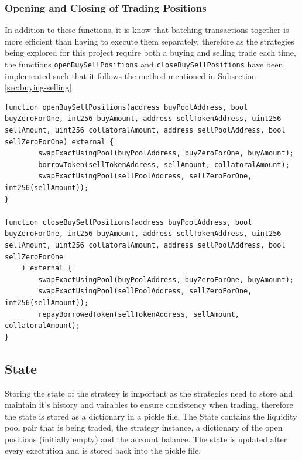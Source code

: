 \subsubsection{Opening and Closing of Trading Positions}
In addition to these functions, it is know that batching transactions together is more efficient than having to execute them separately, therefore as the strategies being explored for this project require both a buying and selling trade each time, the functions \texttt{openBuySellPositions} and \texttt{closeBuySellPositions} have been implemented such that it follows the method mentioned in Subsection \ref{sec:buying-selling}.

\begin{lstlisting}[language=Solidity]
function openBuySellPositions(address buyPoolAddress, bool buyZeroForOne, int256 buyAmount, address sellTokenAddress, uint256 sellAmount, uint256 collatoralAmount, address sellPoolAddress, bool sellZeroForOne) external {
        swapExactUsingPool(buyPoolAddress, buyZeroForOne, buyAmount);
        borrowToken(sellTokenAddress, sellAmount, collatoralAmount);
        swapExactUsingPool(sellPoolAddress, sellZeroForOne, int256(sellAmount));
}

function closeBuySellPositions(address buyPoolAddress, bool buyZeroForOne, int256 buyAmount, address sellTokenAddress, uint256 sellAmount, uint256 collatoralAmount, address sellPoolAddress, bool sellZeroForOne
    ) external {
        swapExactUsingPool(buyPoolAddress, buyZeroForOne, buyAmount);
        swapExactUsingPool(sellPoolAddress, sellZeroForOne, int256(sellAmount));
        repayBorrowedToken(sellTokenAddress, sellAmount, collatoralAmount);
}
\end{lstlisting}

\subsection{State}
Storing the state of the strategy is important as the strategies need to store and maintain it's history and vairables to ensure consistency when trading, therefore the state is stored as a dictionary in a pickle file. The State contains the liquidity pool pair that is being traded, the strategy instance, a dictionary of the open positions (initially empty) and the account balance. The state is updated after every exectution and is stored back into the pickle file.

